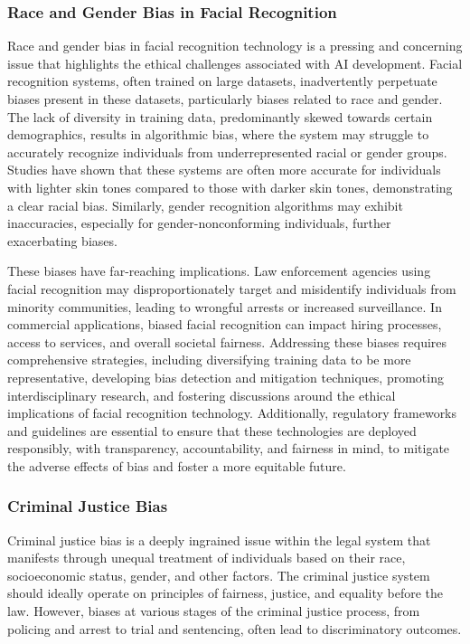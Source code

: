 \documentclass[12pt,a4paper,openright,twoside]{book}
\begin{document}
\subsubsection{Race and Gender Bias in Facial Recognition}
Race and gender bias in facial recognition technology is a pressing and concerning issue that highlights the ethical challenges associated with AI development. Facial recognition systems, often trained on large datasets, inadvertently perpetuate biases present in these datasets, particularly biases related to race and gender. The lack of diversity in training data, predominantly skewed towards certain demographics, results in algorithmic bias, where the system may struggle to accurately recognize individuals from underrepresented racial or gender groups. Studies have shown that these systems are often more accurate for individuals with lighter skin tones compared to those with darker skin tones, demonstrating a clear racial bias. Similarly, gender recognition algorithms may exhibit inaccuracies, especially for gender-nonconforming individuals, further exacerbating biases. \cite{https://doi.org/10.5281/zenodo.4050457}

These biases have far-reaching implications. Law enforcement agencies using facial recognition may disproportionately target and misidentify individuals from minority communities, leading to wrongful arrests or increased surveillance. In commercial applications, biased facial recognition can impact hiring processes, access to services, and overall societal fairness. Addressing these biases requires comprehensive strategies, including diversifying training data to be more representative, developing bias detection and mitigation techniques, promoting interdisciplinary research, and fostering discussions around the ethical implications of facial recognition technology. Additionally, regulatory frameworks and guidelines are essential to ensure that these technologies are deployed responsibly, with transparency, accountability, and fairness in mind, to mitigate the adverse effects of bias and foster a more equitable future.

\subsubsection{Criminal Justice Bias}
Criminal justice bias is a deeply ingrained issue within the legal system that manifests through unequal treatment of individuals based on their race, socioeconomic status, gender, and other factors. The criminal justice system should ideally operate on principles of fairness, justice, and equality before the law. However, biases at various stages of the criminal justice process, from policing and arrest to trial and sentencing, often lead to discriminatory outcomes. \cite{doi:10.1080/10345329.2019.1658694}
\end{document}
